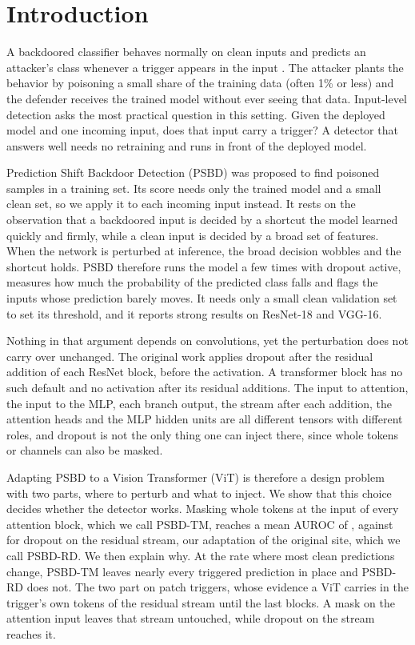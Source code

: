 \section{Introduction}
\label{sec:intro}

A backdoored classifier behaves normally on clean inputs and predicts an
attacker's class whenever a trigger appears in the input
\cite{li2022backdoorsurvey}. The attacker plants the behavior by poisoning a
small share of the training data (often 1\% or less) and the defender receives
the trained model without ever seeing that data. Input-level detection asks the
most practical question in this setting. Given the deployed model and one
incoming input, does that input carry a trigger? A detector that answers well
needs no retraining and runs in front of the deployed model.

Prediction Shift Backdoor Detection (PSBD) \cite{li2025psbd} was proposed to find
poisoned samples in a training set. Its score needs only the trained model and a
small clean set, so we apply it to each incoming input instead.
It rests on the observation that a backdoored input is decided by a shortcut the
model learned quickly and firmly, while a clean input is decided by a broad set
of features. When the network is perturbed at inference, the broad decision
wobbles and the shortcut holds. PSBD therefore runs the model a few times with
dropout active, measures how much the probability of the predicted class falls
and flags the inputs whose prediction barely moves. It needs only a small clean
validation set to set its threshold, and it reports strong results on ResNet-18
and VGG-16.

Nothing in that argument depends on convolutions, yet the perturbation does not
carry over unchanged. The original work applies dropout after the residual
addition of each ResNet block, before the activation. A transformer block has
no such default and no activation after its residual additions. The input to
attention, the input to the MLP, each branch output, the stream after each
addition, the attention heads and the MLP hidden units are all different tensors
with different roles, and dropout is not the only thing one can inject there,
since whole tokens or channels can also be masked.

Adapting PSBD to a Vision Transformer (ViT) \cite{dosovitskiy2021an} is
therefore a design problem with two parts, where to perturb and what to inject.
We show that this choice decides whether the detector works. Masking whole
tokens at the input of every attention block, which we call PSBD-TM, reaches a
mean AUROC of \HeadlineAurocAdaptive{}, against \PublishedAurocAdaptive{} for
dropout on the residual stream, our adaptation of the original site, which we
call PSBD-RD. We then explain why. At the rate where most clean predictions change,
PSBD-TM leaves nearly every triggered prediction in place and PSBD-RD does not.
The two part on patch triggers, whose evidence a ViT carries in the trigger's
own tokens of the residual stream until the last blocks. A mask on the attention
input leaves that stream untouched, while dropout on the stream reaches it.

